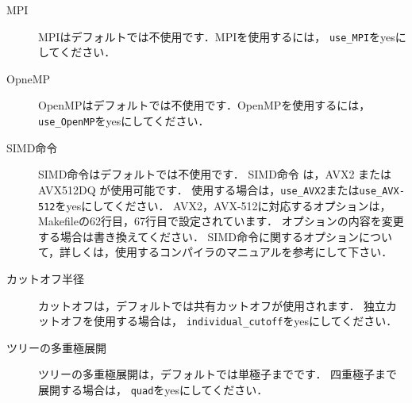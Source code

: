 \documentclass[12pt,a4paper,dvipdfmx]{jsarticle}
\newcommand{\Paper}{Ishigaki et al. (in prep., accepted in PASJ)\xspace}
\begin{document}
\begin{description}
\item[MPI]
MPIはデフォルトでは不使用です．MPIを使用するには，
\texttt{use\_MPI}をyesにしてください．

\item[OpneMP]
OpenMPはデフォルトでは不使用です．OpenMPを使用するには，
\texttt{use\_OpenMP}をyesにしてください．

\item[SIMD命令]
SIMD命令はデフォルトでは不使用です．
SIMD命令 は，AVX2 または AVX512DQ が使用可能です．
使用する場合は，\texttt{use\_AVX2}または\texttt{use\_AVX-512}をyesにしてください．
AVX2，AVX-512に対応するオプションは，Makefileの62行目，67行目で設定されています．
オプションの内容を変更する場合は書き換えてください．
SIMD命令に関するオプションについて，詳しくは，使用するコンパイラのマニュアルを参考にして下さい．

\item[カットオフ半径]
カットオフは，デフォルトでは共有カットオフが使用されます．
独立カットオフを使用する場合は，%
\texttt{individual\_cutoff}をyesにしてください．


\item[ツリーの多重極展開]
ツリーの多重極展開は，デフォルトでは単極子までです．
四重極子まで展開する場合は， %
\texttt{quad}をyesにしてください．





\end{description}
\end{document}
